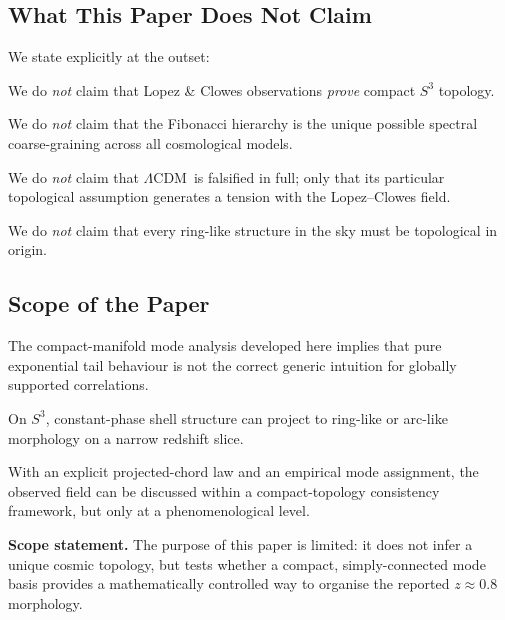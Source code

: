 \documentclass[
  aps,
  prd,
  reprint,
  superscriptaddress,
  nofootinbib,
  longbibliography,
  floatfix,
  amsmath,
  amssymb
]{revtex4-2}
\theoremstyle{plain}
\theoremstyle{definition}
\theoremstyle{remark}
\newcommand{\LCDM}{\ensuremath{\Lambda}CDM}
\newcommand{\Sthree}{S^3}
\begin{document}
\subsection{What This Paper Does Not Claim}

We state explicitly at the outset:

\begin{description}[noitemsep,labelwidth=0.2em,leftmargin=2em]
\item[\textbf{(N1)}] We do \emph{not} claim that Lopez \& Clowes
  observations \emph{prove} compact $\Sthree$ topology.
\item[\textbf{(N2)}] We do \emph{not} claim that the Fibonacci
  hierarchy is the unique possible spectral coarse-graining across
  all cosmological models.
\item[\textbf{(N3)}] We do \emph{not} claim that \LCDM\ is falsified
  in full; only that its particular topological assumption generates
  a tension with the Lopez--Clowes field.
\item[\textbf{(N4)}] We do \emph{not} claim that every ring-like
  structure in the sky must be topological in origin.
\end{description}

\subsection{Scope of the Paper}

\begin{description}[noitemsep,labelwidth=0.2em,leftmargin=2em]
\item[\textbf{(S1)}] The compact-manifold mode analysis developed
  here implies that pure exponential tail behaviour is not the correct
  generic intuition for globally supported correlations.
\item[\textbf{(S2)}] On $\Sthree$, constant-phase shell structure can
  project to ring-like or arc-like morphology on a narrow redshift
  slice.
\item[\textbf{(S3)}] With an explicit projected-chord law and an empirical mode assignment, the
  observed field can be discussed within a compact-topology consistency
  framework, but only at a phenomenological level.
\end{description}

\medskip
\noindent
\textbf{Scope statement.} The purpose of this paper is limited: it does
not infer a unique cosmic topology, but tests whether a compact,
simply-connected mode basis provides a mathematically controlled way to
organise the reported $z\approx 0.8$ morphology.
\end{document}
